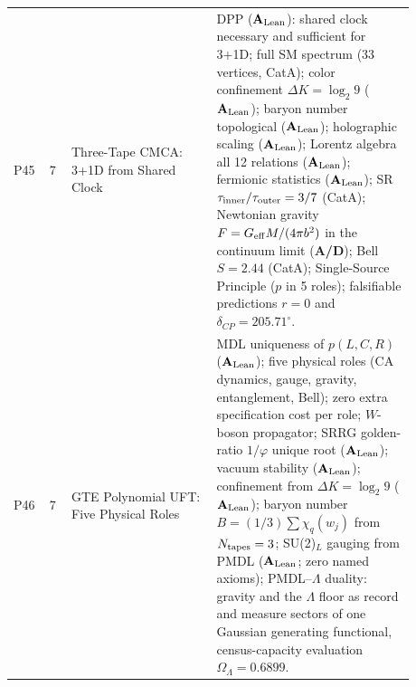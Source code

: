 \documentclass[11pt]{article}
\newcommand{\CatAL}{\ensuremath{\textbf{A}_{\rm Lean}}}
\newcommand{\CatAD}{\textbf{A/D}}
\begin{document}
\begin{longtable}{@{}P{0.05\linewidth}P{0.05\linewidth}P{0.33\linewidth}P{0.45\linewidth}@{}}
P45 & 7 & Three-Tape CMCA: 3+1D from Shared Clock & DPP ($\CatAL$): shared clock necessary and sufficient for 3+1D; full SM spectrum (33 vertices, CatA); color confinement $\Delta K = \log_2 9$ ($\CatAL$); baryon number topological ($\CatAL$); holographic scaling ($\CatAL$); Lorentz algebra all 12 relations ($\CatAL$); fermionic statistics ($\CatAL$); SR $\tau_{\rm inner}/\tau_{\rm outer}=3/7$ (CatA); Newtonian gravity $F = G_{\rm eff}M/(4\pi b^2)$ in the continuum limit (\CatAD); Bell $S=2.44$ (CatA); Single-Source Principle ($p$ in 5 roles); falsifiable predictions $r=0$ and $\delta_{CP}=205.71^\circ$. \\
P46 & 7 & GTE Polynomial UFT: Five Physical Roles & MDL uniqueness of $p(L,C,R)$ ($\CatAL$); five physical roles (CA dynamics, gauge, gravity, entanglement, Bell); zero extra specification cost per role; $W$-boson propagator; SRRG golden-ratio $1/\varphi$ unique root ($\CatAL$); vacuum stability ($\CatAL$); confinement from $\Delta K=\log_2 9$ ($\CatAL$); baryon number $B=(1/3)\sum\chi_q(w_j)$ from $N_{\rm tapes}=3$; SU(2)$_L$ gauging from PMDL ($\CatAL$; zero named axioms); PMDL--$\Lambda$ duality: gravity and the $\Lambda$ floor as record and measure sectors of one Gaussian generating functional, census-capacity evaluation $\Omega_\Lambda=0.6899$. \\

\end{longtable}
\end{document}
